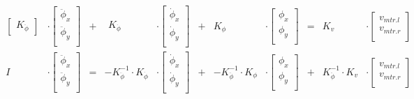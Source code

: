 \documentclass{scrreprt}
\begin{document}
\begin{gather}
\begin{array}{ccccccccccc}
\begin{bmatrix}
K_{\ddot{\phi}}
\end{bmatrix}
& \cdot 
\begin{bmatrix}
\ddot{\phi}_{x}\\
\ddot{\phi}_{y}\\
\end{bmatrix}
& + &
\begin{gathered}
K_{\dot{\phi}}
\end{gathered}
& \cdot 
\begin{bmatrix}
\dot{\phi}_{x}\\
\dot{\phi}_{y}\\
\end{bmatrix}
& + &
K_{\phi}
& \cdot 
\begin{bmatrix}
\phi_{x}\\
\phi_{y}\\
\end{bmatrix}
& = &
K_{v}
& \cdot
\begin{bmatrix}
v_{mtr.l}\\
v_{mtr.r}\\
\end{bmatrix}
\\[+2em]
I
& \cdot
\begin{bmatrix}
\ddot{\phi}_{x}\\
\ddot{\phi}_{y}\\
\end{bmatrix}
& = &
-K_{\ddot{\phi}}^{-1}
\cdot 
K_{\dot{\phi}} 
& \cdot 
\begin{bmatrix}
\dot{\phi}_{x}\\
\dot{\phi}_{y}\\
\end{bmatrix}
& + &
-K_{\ddot{\phi}}^{-1}
\cdot 
K_{\phi}
& \cdot 
\begin{bmatrix}
\phi_{x}\\
\phi_{y}\\
\end{bmatrix}
& + &
K_{\ddot{\phi}}^{-1}
\cdot 
K_{v}
& \cdot
\begin{bmatrix}
v_{mtr.l}\\
v_{mtr.r}\\
\end{bmatrix}
\end{array}
\end{gather}
\end{document}
